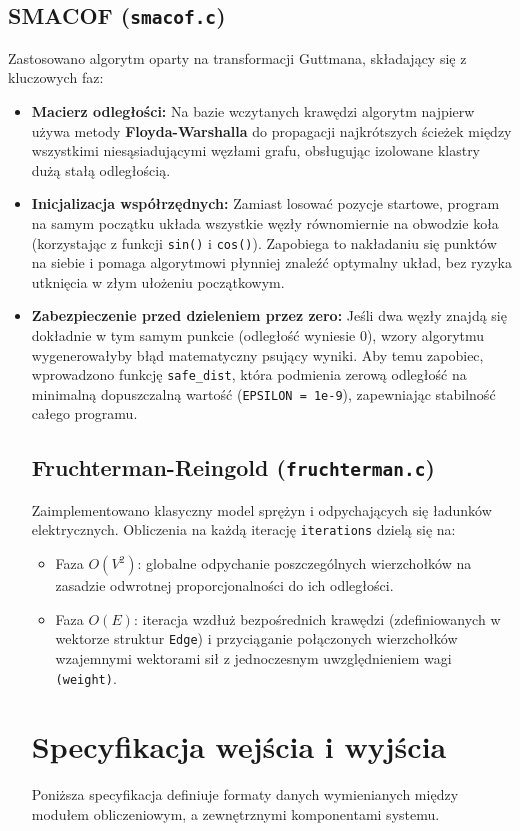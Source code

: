 \documentclass[12pt,a4paper]{article}
\begin{document}
\subsection{SMACOF (\texttt{smacof.c})}
Zastosowano algorytm oparty na transformacji Guttmana, składający się z kluczowych faz:
\begin{itemize}
    \item \textbf{Macierz odległości:} Na bazie wczytanych krawędzi algorytm najpierw używa metody \textbf{Floyda-Warshalla} do propagacji najkrótszych ścieżek między wszystkimi niesąsiadującymi węzłami grafu, obsługując izolowane klastry dużą stałą odległością.
    \item \textbf{Inicjalizacja współrzędnych:} Zamiast losować pozycje startowe, program na samym początku układa wszystkie węzły równomiernie na obwodzie koła (korzystając z funkcji \texttt{sin()} i \texttt{cos()}). Zapobiega to nakładaniu się punktów na siebie i pomaga algorytmowi płynniej znaleźć optymalny układ, bez ryzyka utknięcia w złym ułożeniu początkowym.
    \item \textbf{Zabezpieczenie przed dzieleniem przez zero:} Jeśli dwa węzły znajdą się dokładnie w tym samym punkcie (odległość wyniesie 0), wzory algorytmu wygenerowałyby błąd matematyczny psujący wyniki. Aby temu zapobiec, wprowadzono funkcję \texttt{safe\_dist}, która podmienia zerową odległość na minimalną dopuszczalną wartość (\texttt{EPSILON = 1e-9}), zapewniając stabilność całego programu.

\subsection{Fruchterman-Reingold (\texttt{fruchterman.c})}
Zaimplementowano klasyczny model sprężyn i odpychających się ładunków elektrycznych. Obliczenia na każdą iterację \texttt{iterations} dzielą się na:
\begin{itemize}
    \item Faza $O(V^2)$: globalne odpychanie poszczególnych wierzchołków na zasadzie odwrotnej proporcjonalności do ich odległości.
    \item Faza $O(E)$: iteracja wzdłuż bezpośrednich krawędzi (zdefiniowanych w wektorze struktur \texttt{Edge}) i przyciąganie połączonych wierzchołków wzajemnymi wektorami sił z jednoczesnym uwzględnieniem wagi \texttt{(weight)}.
\end{itemize}

\section{Specyfikacja wejścia i wyjścia}
Poniższa specyfikacja definiuje formaty danych wymienianych między modułem obliczeniowym, a zewnętrznymi komponentami systemu.


\end{itemize}
\end{document}
